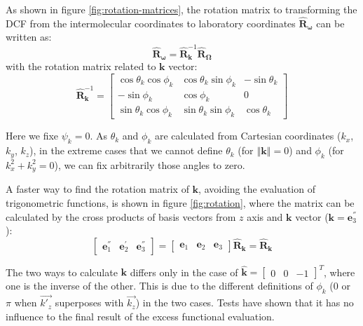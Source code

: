 As shown in figure \ref{fig:rotation-matrices}, the rotation matrix
to transforming the DCF from the intermolecular coordinates to laboratory
coordinates $\mathbf{\hat{R}}_{\boldsymbol{\omega}}$ can be written
as:
\begin{equation}
\mathbf{\hat{R}}_{\boldsymbol{\omega}}=\mathbf{\hat{R}}_{\mathbf{k}}^{-1}\mathbf{\hat{R}}_{\mathbf{\Omega}}\label{eq:rot-matrix}
\end{equation}
with the rotation matrix related to $\mathbf{k}$ vector:
\begin{equation}
\mathbf{\hat{R}}_{\mathbf{k}}^{-1}=\left[\begin{array}{ccc}
\cos\theta_{k}\cos\phi_{k} & \cos\theta_{k}\sin\phi_{k} & -\sin\theta_{k}\\
-\sin\phi_{k} & \cos\phi_{k} & 0\\
\sin\theta_{k}\cos\phi_{k} & \sin\theta_{k}\sin\phi_{k} & \cos\theta_{k}
\end{array}\right]
\end{equation}


Here we fixe $\psi_{k}=0$. As $\theta_{k}$ and $\phi_{k}$ are calculated
from Cartesian coordinates ($k_{x}$, $k_{y}$, $k_{z}$), in the
extreme cases that we cannot define $\theta_{k}$ (for $\left\Vert \mathbf{k}\right\Vert =0$)
and $\phi_{k}$ (for $k_{x}^{2}+k_{y}^{2}=0$), we can fix arbitrarily
those angles to zero.

A faster way to find the rotation matrix of $\mathbf{k}$, avoiding
the evaluation of trigonometric functions, is shown in figure \ref{fig:rotation},
where the matrix can be calculated by the cross products of basis
vectors from $z$ axis and $\mathbf{k}$ vector ($\mathbf{k}=\mathbf{e}_{3}^{''}$):
\begin{equation}
\left[\begin{array}{ccc}
\mathbf{e}_{1}^{''} & \mathbf{e}_{2}^{'} & \mathbf{e}_{3}^{''}\end{array}\right]=\left[\begin{array}{ccc}
\mathbf{e}_{1} & \mathbf{e}_{2} & \mathbf{e}_{3}\end{array}\right]\mathbf{\hat{R}_{k}}=\mathbf{\hat{R}_{k}}
\end{equation}


The two ways to calculate $\mathbf{k}$ differs only in the case of
$\hat{\mathbf{k}}=\left[\begin{array}{ccc}
0 & 0 & -1\end{array}\right]^{T}$, where one is the inverse of the other. This is due to the different
definitions of $\phi_{k}$ ($0$ or $\pi$ when $\overrightarrow{k'_{z}}$
superposes with $\overrightarrow{k_{z}}$) in the two cases. Tests
have shown that it has no influence to the final result of the excess
functional evaluation.

